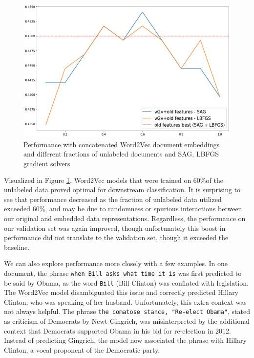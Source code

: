 \documentclass[11pt,a4paper]{article}
\begin{document}
  \vspace{-10pt}
\begin{figure}[htpb]
  \centering
  \includegraphics[width=1\linewidth]{imgs/w2v_classification.png}
  \caption{Performance with concatenated Word2Vec document embeddings and different fractions of unlabeled documents and SAG, LBFGS gradient solvers}
  \label{fig:imgs/w2v_classification}
  \vspace{-11pt}
\end{figure}

Visualized in Figure \ref{fig:imgs/w2v_classification}, Word2Vec models that were trained on 60\%of the unlabeled data proved optimal for downstream classification. It is surprising to see that performance decreased as the fraction of unlabeled data utilized exceeded 60\%, and may be due to randomness or spurious interactions between our original and embedded data representations. Regardless, the performance on our validation set was again improved, though unfortunately this boost in performance did not translate to the validation set, though it exceeded the baseline.

We can also explore performance more closely with a few examples. In one document, the phrase \texttt{when Bill asks what time it is} was first predicted to be said by Obama, as the word \texttt{Bill} (Bill Clinton) was conflated with legislation. The Word2Vec model disambiguated this issue and correctly predicted Hillary Clinton, who was speaking of her husband. Unfortunately, this extra context was not always helpful. The phrase \texttt{the comatose stance, "Re-elect Obama"}, stated as criticism of Democrats by Newt Gingrich, was misinterpreted by the additional context that Democrats supported Obama in his bid for re-election in 2012. Instead of predicting Gingrich, the model now associated the phrase with Hillary Clinton, a vocal proponent of the Democratic party.
\end{document}
